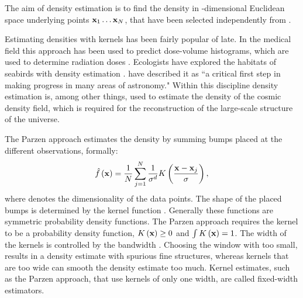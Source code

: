 The aim of density estimation is to find the density \varDensityFunction{\varPattern} in \varDim-dimensional Euclidean space underlying \varNumPatterns points $\varPattern[1] \dotsc \varPattern[\varNumPatterns]$, that have been selected independently from \varDensityFunction{\varPattern}. 

Estimating densities with kernels has been fairly popular of late. In the medical field this approach has been used to predict dose-volume histograms, which are used to determine radiation doses \cite{SkarpmanDose2015}. Ecologists have explored the habitats of seabirds with density estimation \cite{lees2016using}. \textcite{ferdosi2011comparison} have described it as ``a critical first step in making progress in many areas of astronomy."  Within this discipline  density estimation is, among other things, used to estimate the density of the cosmic density field, which is required for the reconstruction of the large-scale structure of the universe.

	The Parzen approach \cite{parzen1962estimation} estimates the density by summing bumps placed at the different observations, formally:
	\begin{equation}\label{eq:1:parzen}
		\varEstimatedDensityFunction{\varPattern} = \frac{1}{\varNumPatterns}\sum_{j = 1}^{\varNumPatterns} \frac{1}{\varBandwidth^\varDim}\varKernel{\frac{\varPattern - \varPattern[j]}{\varBandwidth}},
	\end{equation}
	where \varDim denotes the dimensionality of the data points. The shape of the placed bumps is determined by the kernel function \varKernel{\cdot}. Generally these functions are symmetric probability density functions. The Parzen approach requires the kernel to be a probability density function, \ie $\varKernel{\varPattern} \geq 0$ and $\int \varKernel{\varPattern} = 1$. 
	The width of the kernels is controlled by the bandwidth \varBandwidth \cite{silverman1986density}. Choosing the window with too small, results in a density estimate with spurious fine structures, whereas kernels that are too wide can smooth the density estimate too much. Kernel estimates, such as the Parzen approach, that use kernels of only one width, are called fixed-width estimators.

